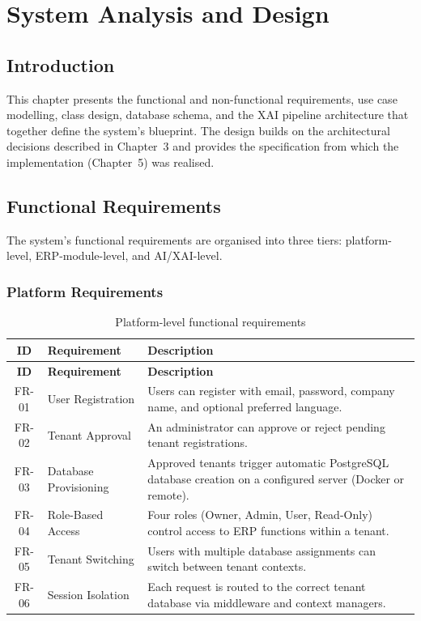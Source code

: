 \documentclass[12pt,a4paper]{report}
\begin{document}
%
%
\chapter{System Analysis and Design}
\label{ch:analysis_design}

\section{Introduction}
\label{sec:ad_intro}

This chapter presents the functional and non-functional requirements, use case modelling, class design, database schema, and the XAI pipeline architecture that together define the system's blueprint. The design builds on the architectural decisions described in Chapter~3 and provides the specification from which the implementation (Chapter~5) was realised.

\section{Functional Requirements}
\label{sec:functional_req}

The system's functional requirements are organised into three tiers: platform-level, ERP-module-level, and AI/XAI-level.

\subsection{Platform Requirements}

\begin{longtable}{c p{3cm} p{8cm}}
\caption{Platform-level functional requirements} \label{tab:platform_req} \\
\toprule
\textbf{ID} & \textbf{Requirement} & \textbf{Description} \\
\midrule
\endfirsthead
\toprule
\textbf{ID} & \textbf{Requirement} & \textbf{Description} \\
\midrule
\endhead
FR-01 & User Registration & Users can register with email, password, company name, and optional preferred language. \\
FR-02 & Tenant Approval & An administrator can approve or reject pending tenant registrations. \\
FR-03 & Database Provisioning & Approved tenants trigger automatic PostgreSQL database creation on a configured server (Docker or remote). \\
FR-04 & Role-Based Access & Four roles (Owner, Admin, User, Read-Only) control access to ERP functions within a tenant. \\
FR-05 & Tenant Switching & Users with multiple database assignments can switch between tenant contexts. \\
FR-06 & Session Isolation & Each request is routed to the correct tenant database via middleware and context managers. \\
\bottomrule
\end{longtable}
\end{document}
